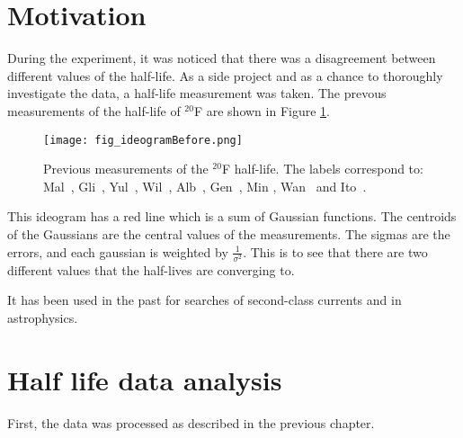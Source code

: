 

\section{Motivation}
During the experiment, it was noticed that there was a disagreement between different values of the half-life.
As a side project and as a chance to thoroughly investigate the data, a half-life measurement was taken. 
The prevous measurements of the half-life of $^{20}$F are shown in Figure \ref{fig:IDBefore}.

\begin{figure}[!htb]
	\centerline{\texttt{[image: fig\_ideogramBefore.png]}}
	\caption{Previous measurements of  the $^{20}$F half-life.
		 The labels correspond to: Mal~\cite{Mal62}, Gli~\cite{Gli63},
		Yul~\cite{Yul67}, Wil~\cite{Wil70}, Alb~\cite{Alb75}, Gen~\cite{Gen76},
		Min \cite{Min87}, Wan~\cite{Wan92} and Ito~\cite{Ito95}.}
	\label{fig:IDBefore}
\end{figure}

This ideogram has a red line which is a sum of Gaussian functions.
The centroids of the Gaussians are the central values of the measurements.
The sigmas are the errors, and each gaussian is weighted by $\frac{1}{\sigma^{2}}$.
This is to see that there are two different values that the half-lives are converging to.

It has been used in the past for searches of second-class currents and in astrophysics.

\section{Half life data analysis}
\label{sec:analysis}
First, the data was processed as described in the previous chapter.

